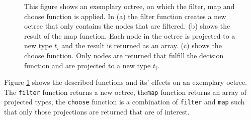 \begin{figure}[h]
    \centering
    \par\medskip
    \par\medskip        
    \caption{This figure shows an exemplary octree, on which the filter, map and choose function is applied. In (a) the filter function creates a new octree that only contains the nodes that are filtered. (b) shows the result of the map function. Each node in the octree is projected to a new type $t_{i}$ and the result is returned as an array. (c) shows the choose function. Only nodes are returned that fulfill the decision function and are projected to a new type $t_{i}$. }
    \label{fig:octreeFuns}
\end{figure}


Figure \ref{fig:octreeFuns} shows the described functions and its' effects on an exemplary octree. The \verb|filter| function returns a new octree, the\verb|map| function returns an array of projected types, the \verb|choose| function is a combination of \verb|filter| and \verb|map| such that only those projections are returned that are of interest. 


